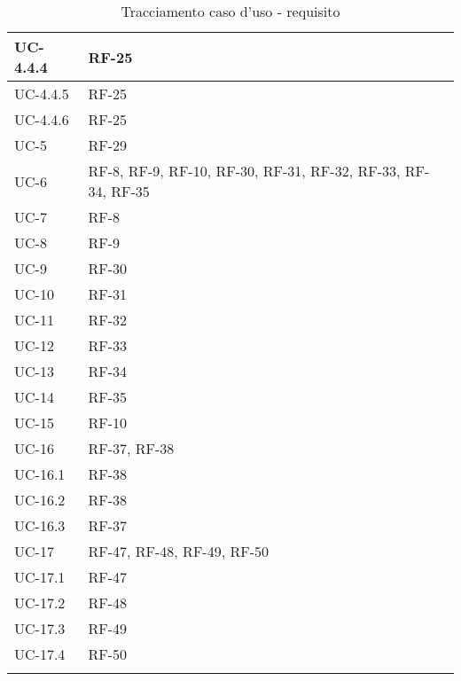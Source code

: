 \begin{longtable}{|>{\centering\arraybackslash}m{}|>{\centering\arraybackslash}m{}|}
	UC-4.4.4            & RF-25                   \\\hline
	UC-4.4.5            & RF-25                   \\\hline
	UC-4.4.6            & RF-25                   \\\hline
	UC-5                & RF-29                   \\\hline
	UC-6                & RF-8, RF-9, RF-10, RF-30, RF-31, RF-32, RF-33, RF-34, RF-35 \\\hline
	UC-7                & RF-8                    \\\hline
	UC-8                & RF-9                    \\\hline
	UC-9                & RF-30                   \\\hline
	UC-10               & RF-31                   \\\hline
	UC-11               & RF-32                   \\\hline
	UC-12               & RF-33                   \\\hline
	UC-13               & RF-34                   \\\hline
	UC-14               & RF-35                   \\\hline
	UC-15               & RF-10                   \\\hline
	UC-16               & RF-37, RF-38            \\\hline
	UC-16.1             & RF-38                   \\\hline
	UC-16.2             & RF-38                   \\\hline
	UC-16.3             & RF-37                   \\\hline
	UC-17               & RF-47, RF-48, RF-49, RF-50 \\\hline
	UC-17.1             & RF-47                   \\\hline
	UC-17.2             & RF-48                   \\\hline
	UC-17.3             & RF-49                   \\\hline
	UC-17.4             & RF-50                   \\\hline
	\caption{Tracciamento caso d'uso - requisito}
\end{longtable}

